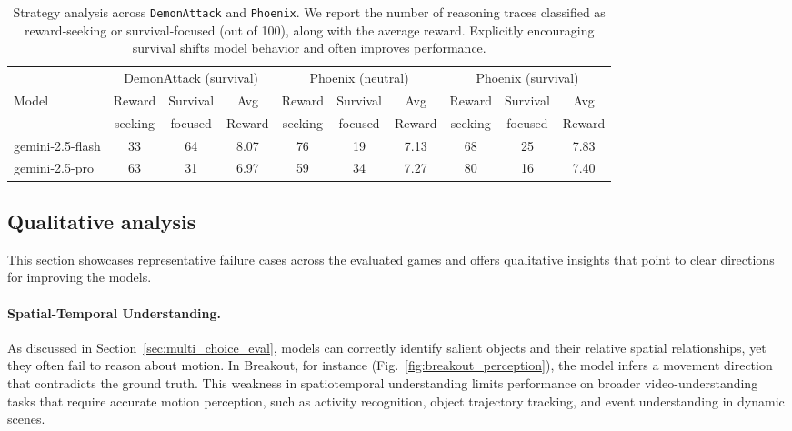 \begin{table}[t]
\centering
\begin{tabular}{l|ccc|ccc|ccc}
\small
\toprule
& \multicolumn{3}{c|}{DemonAttack (survival)} 
& \multicolumn{3}{c|}{Phoenix (neutral)} 
& \multicolumn{3}{c}{Phoenix (survival)} \\
\cmidrule(lr){2-4} \cmidrule(lr){5-7} \cmidrule(lr){8-10}
Model 
& Reward & Survival & Avg 
& Reward & Survival & Avg 
& Reward & Survival & Avg \\
& seeking & focused & Reward 
& seeking & focused & Reward 
& seeking & focused & Reward \\
\midrule
gemini-2.5-flash 
& 33 & 64 & 8.07 
& 76 & 19 & 7.13 
& 68 & 25 & 7.83 \\
gemini-2.5-pro   
& 63 & 31 & 6.97 
& 59 & 34 & 7.27 
& 80 & 16 & 7.40 \\
\bottomrule
\end{tabular}
\caption{Strategy analysis across \texttt{DemonAttack} and \texttt{Phoenix}. We report the number of reasoning traces classified as reward-seeking or survival-focused (out of 100), along with the average reward. Explicitly encouraging survival shifts model behavior and often improves performance.}
\label{tab:strategy_analysis}
\end{table}







\subsection{Qualitative analysis}
This section showcases representative failure cases across the evaluated games and offers qualitative insights that point to clear directions for improving the models.

\paragraph{Spatial-Temporal Understanding.}

As discussed in Section~\ref{sec:multi_choice_eval}, models can correctly identify salient objects and their relative spatial relationships, yet they often fail to reason about motion. In Breakout, for instance (Fig.~\ref{fig:breakout_perception}), the model infers a movement direction that contradicts the ground truth. This weakness in spatiotemporal understanding limits performance on broader video-understanding tasks that require accurate motion perception, such as activity recognition, object trajectory tracking, and event understanding in dynamic scenes.


